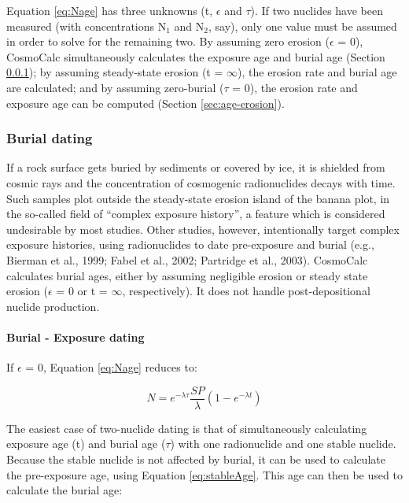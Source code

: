 \documentclass{article}
\begin{document}
Equation \ref{eq:Nage} has three  unknowns (t, $\epsilon$ and $\tau$). 
If  two nuclides  have been  measured (with  concentrations  N$_1$ and
N$_2$, say), only one value must  be assumed in order to solve for the
remaining two.   By assuming zero erosion ($\epsilon$  = 0), CosmoCalc
simultaneously  calculates the  exposure age  and burial  age (Section
\ref{sec:burial});  by assuming steady-state  erosion (t  = $\infty$),
the  erosion rate  and  burial  age are  calculated;  and by  assuming
zero-burial ($\tau$  = 0),  the erosion rate  and exposure age  can be
computed (Section \ref{sec:age-erosion}).

\subsubsection{Burial dating}\label{sec:burial}

If a  rock surface gets buried by  sediments or covered by  ice, it is
shielded  from  cosmic  rays   and  the  concentration  of  cosmogenic
radionuclides  decays  with  time.   Such  samples  plot  outside  the
steady-state erosion island of the banana plot, in the so-called field
of  ``complex  exposure  history'',  a  feature  which  is  considered
undesirable  by most studies.   Other studies,  however, intentionally
target  complex  exposure   histories,  using  radionuclides  to  date
pre-exposure and  burial (e.g.,  Bierman et al.,  1999; Fabel  et al.,
2002;  Partridge et  al.,  2003).  CosmoCalc  calculates burial  ages,
either  by  assuming  negligible   erosion  or  steady  state  erosion
($\epsilon$ =  0 or t =  $\infty$, respectively).  It  does not handle
post-depositional nuclide production.

\paragraph{Burial - Exposure dating\\}

If $\epsilon$ = 0, Equation \ref{eq:Nage} reduces to:

\begin{equation}
  \label{eq:burialExposure}
  N = e^{-\lambda \tau} \frac{SP}{\lambda} \left( 1 - e^{- \lambda t}  \right)
\end{equation}

The  easiest case  of  two-nuclide dating  is  that of  simultaneously
calculating  exposure  age  (t)  and  burial  age  ($\tau$)  with  one
radionuclide and  one stable nuclide.   Because the stable  nuclide is
not affected by  burial, it can be used  to calculate the pre-exposure
age, using Equation  \ref{eq:stableAge}. This age can then  be used to
calculate the burial age:
\end{document}
